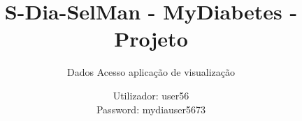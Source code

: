 \documentclass[handout]{beamer}
\title{S-Dia-SelMan - MyDiabetes - Projeto}
\subtitle{Dados Acesso aplicação de visualização}
\author{Utilizador: user56\\
Password: mydiauser5673}
\date{}
\institute{\url{mydiabetes@dcc.fc.up.pt}\\\url{http://mydiabetes.dcc.fc.up.pt/}}
\begin{document}
\begin{frame}[plain,t]
\titlepage
\end{frame}
\end{document}
